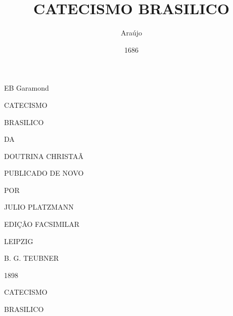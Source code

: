 \documentclass[openany,titlepage,12pt]{book}
\title{CATECISMO BRASILICO}
\author{Araújo}
\date{1686}
\begin{document}
\setmainfont[Ligatures=Historic, Style=Historic]
{EB Garamond}
\maketitle

\begin{titlepage}
    \begin{center}
        CATECISMO
        \vspace*{15pt}

        {\huge BRASILICO}
        \vspace*{15pt}

        {\tiny DA}
        \vspace*{15pt}

        DOUTRINA CHRISTAÃ
        \vspace*{15pt}

        {\tiny PUBLICADO DE NOVO} 
        \vspace*{15pt}

        {\tiny POR}
        \vspace*{15pt}

        JULIO PLATZMANN
        \vspace*{15pt}

        {\tiny EDIÇÂO FACSIMILAR}
        \vspace*{60pt}

        {\tiny LEIPZIG
        \vspace*{15pt}

        B. G. TEUBNER
        \vspace*{15pt}

        1898}

    \end{center}  
    \clearpage
\end{titlepage}

\begin{center}
    \vspace*{20pt}
    {\huge CATECISMO}
    \vspace*{20pt}

    {\large BRASILICO}
\end{center}
\pagebreak
\end{document}
